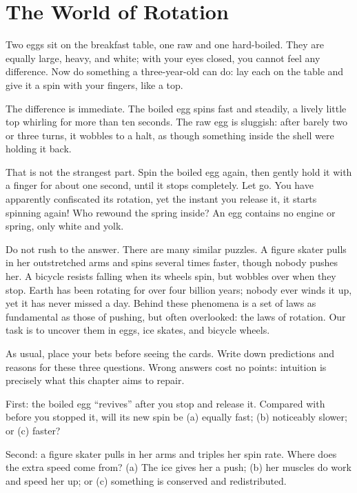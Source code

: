 \chapter{The World of Rotation}


\begin{mainline}
Two eggs sit on the breakfast table, one raw and one hard-boiled. They are equally large, heavy, and white; with your eyes closed, you cannot feel any difference. Now do something a three-year-old can do: lay each on the table and give it a spin with your fingers, like a top.

The difference is immediate. The boiled egg spins fast and steadily, a lively little top whirling for more than ten seconds. The raw egg is sluggish: after barely two or three turns, it wobbles to a halt, as though something inside the shell were holding it back.

That is not the strangest part. Spin the boiled egg again, then gently hold it with a finger for about one second, until it stops completely. Let go. You have apparently confiscated its rotation, yet the instant you release it, it starts spinning again! Who rewound the spring inside? An egg contains no engine or spring, only white and yolk.

Do not rush to the answer. There are many similar puzzles. A figure skater pulls in her outstretched arms and spins several times faster, though nobody pushes her. A bicycle resists falling when its wheels spin, but wobbles over when they stop. Earth has been rotating for over four billion years; nobody ever winds it up, yet it has never missed a day. Behind these phenomena is a set of laws as fundamental as those of pushing, but often overlooked: the laws of rotation. Our task is to uncover them in eggs, ice skates, and bicycle wheels.
\end{mainline}


As usual, place your bets before seeing the cards. Write down predictions and reasons for these three questions. Wrong answers cost no points: intuition is precisely what this chapter aims to repair.

First: the boiled egg ``revives'' after you stop and release it. Compared with before you stopped it, will its new spin be (a) equally fast; (b) noticeably slower; or (c) faster?

Second: a figure skater pulls in her arms and triples her spin rate. Where does the extra speed come from? (a) The ice gives her a push; (b) her muscles do work and speed her up; or (c) something is conserved and redistributed.

